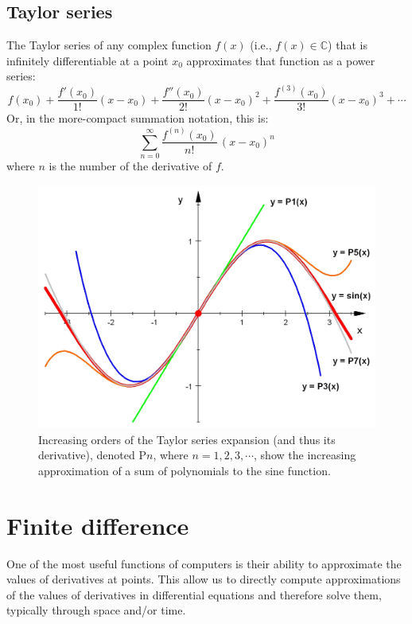 \documentclass[a4paper,10pt]{scrartcl}
\begin{document}
\subsection{Taylor series}

The Taylor series of any complex function $f(x)$ (i.e., $f(x) \in \mathbb{C}$) that is infinitely differentiable at a point $x_0$ approximates that function as a power series:
\begin{equation}
f(x_0)+\frac {f'(x_0)}{1!} (x-x_0)+ \frac{f''(x_0)}{2!} (x-x_0)^2+\frac{f^{(3)}(x_0)}{3!}(x-x_0)^3+ \cdots
\end{equation}
Or, in the more-compact summation notation, this is:
\begin{equation}
\sum_{n=0} ^ {\infty} \frac {f^{(n)}(x_0)}{n!} \, (x-x_0)^{n}
\end{equation}
where $n$ is the number of the derivative of $f$.

\begin{figure}[!ht]
\begin{center}
\includegraphics[width=.8\linewidth]{figures/NumericalAndMath/Taylor_Approximation_of_sin(x).jpeg}
\end{center}
\caption{Increasing orders of the Taylor series expansion (and thus its derivative), denoted P$n$, where $n = 1, 2, 3, \cdots$, show the increasing approximation of a sum of polynomials to the sine function.}
\end{figure}

\section{Finite difference}

One of the most useful functions of computers is their ability to approximate the values of derivatives at points. This allow us to directly compute approximations of the values of derivatives in differential equations and therefore solve them, typically through space and/or time.
\end{document}
